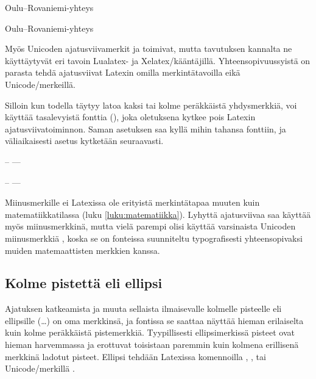 \pagebreak[3]

\begin{koodilohkosis}
  Oulu--Rovaniemi-yhteys
\end{koodilohkosis}

\begin{tulossis}
  Oulu--Rovaniemi-yhteys
\end{tulossis}

Myös Unicoden ajatusviivamerkit  ja
 toimivat, mutta tavutuksen kannalta ne
käyttäytyvät eri tavoin Lua\-latex- ja Xelatex\-/kääntäjillä.
Yhteensopivuussyistä on parasta tehdä ajatusviivat Latexin omilla
merkintätavoilla eikä Unicode\-/merkeillä.

Silloin kun todella täytyy latoa kaksi tai kolme peräkkäistä
yhdysmerkkiä, voi käyttää tasalevyistä fonttia (), joka oletuksena kytkee pois Latexin
ajatusviivatoiminnon. Saman asetuksen saa kyllä mihin tahansa fonttiin,
ja väliaikaisesti asetus kytketään seuraavasti.

\pagebreak[3]

\begin{koodilohkosis}
  { -- ---}
\end{koodilohkosis}

\begin{tulossis}
  { -- ---}
\end{tulossis}

Miinusmerkille ei Latexissa ole erityistä merkintätapaa muuten kuin
matematiikkatilassa (luku \ref{luku:matematiikka}). Lyhyttä ajatusviivaa
saa käyttää myös miinusmerkkinä, mutta vielä parempi olisi käyttää
varsinaista Unicoden miinusmerkkiä , koska
se on fonteissa suunniteltu typografisesti yhteensopivaksi muiden
matemaattisten merkkien kanssa.

\subsection{Kolme pistettä eli ellipsi}

Ajatuksen katkeamista ja muuta sellaista ilmaisevalle kolmelle pisteelle
eli ellipsille (\ldots) on oma merkkinsä, ja fontissa se saattaa näyttää
hieman erilaiselta kuin kolme peräkkäistä pistemerkkiä. Tyypillisesti
ellipsimerkissä pisteet ovat hieman harvemmassa ja erottuvat toisistaan
paremmin kuin kolmena erillisenä merkkinä ladotut pisteet. Ellipsi
tehdään Latexissa komennoilla , ,
 tai Unicode\-/merkillä .

